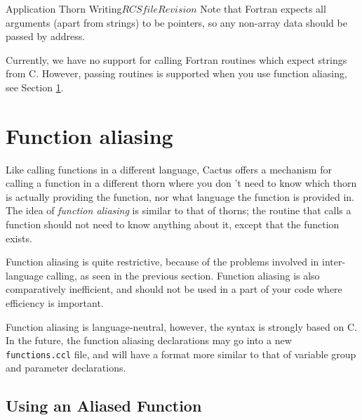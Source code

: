 \begin{cactuspart}{Application Thorn Writing}{$RCSfile$}{$Revision$}
Note that Fortran expects all arguments (apart from strings) to be
pointers, so any non-array data should be passed by address.

Currently, we have no support for calling Fortran routines which expect
strings from C. However, passing routines is supported when you use function aliasing, see Section \ref{sec:function_aliasing}.


\section{Function aliasing}
\label{sec:function_aliasing}

Like calling functions in a different language, Cactus offers a
mechanism for calling a function in a different thorn where you don 't need
to know which thorn is actually providing the function, nor what
language the function is provided in. The idea of \textit{function
aliasing} is similar to that of thorns; the routine that calls a
function should not need to know anything about it, except that the
function exists.

Function aliasing is quite restrictive, because of the problems
involved in inter-language calling, as seen in the previous
section. Function aliasing is also comparatively inefficient, and
should not be used in a part of your code where efficiency is
important.

Function aliasing is language-neutral, however, the syntax is strongly
based on C. In the future, the function aliasing
declarations may go into a new \texttt{functions.ccl} file, and will
have a format more similar to that of variable group and parameter
declarations.

\subsection{Using an Aliased Function}


\end{cactuspart}
